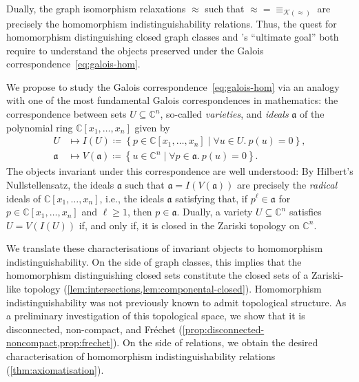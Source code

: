 \documentclass[11pt]{scrartcl}
\theoremstyle{definition}
\theoremstyle{plain}
\theoremstyle{remark}
\begin{document}
	
    Dually, the graph isomorphism relaxations $\approx$ such that ${\approx} = {\equiv_{\mathcal{K}({\approx})}}$
	are precisely the homomorphism indistinguishability relations.
	Thus, the quest for homomorphism distinguishing closed graph classes and \citeauthor{atserias_expressive_2021}'s \enquote{ultimate goal} both require to understand the objects preserved under the Galois correspondence~\eqref{eq:galois-hom}. 

	We propose to study the Galois correspondence~\eqref{eq:galois-hom} via an analogy with one of the most fundamental Galois correspondences in mathematics: 
	the correspondence between sets $U \subseteq \mathbb{C}^n$, so-called \emph{varieties}, and \emph{ideals} $\mathfrak{a}$ of the polynomial ring $\mathbb{C}[x_1, \dots, x_n]$ given by
	\begin{align*}
		U &\mapsto I(U) \coloneqq \left\{p \in \mathbb{C}[x_1, \dots, x_n] \mid\forall u \in U .\  p(u) = 0 \right\}, \\
		\mathfrak{a} & \mapsto V(\mathfrak{a}) \coloneqq \left\{u \in \mathbb{C}^n \mid \forall p \in \mathfrak{a}.\ p(u) = 0 \right\}.
	\end{align*}
	The objects invariant under this correspondence are well understood:
	By Hilbert's Nullstellensatz, the ideals $\mathfrak{a}$ such that $\mathfrak{a} = I(V(\mathfrak{a}))$ are precisely the \emph{radical} ideals of $\mathbb{C}[x_1, \dots, x_n]$, i.e., the ideals $\mathfrak{a}$ satisfying that, if $p^\ell \in \mathfrak{a}$ for $p \in \mathbb{C}[x_1, \dots, x_n]$ and $\ell \geq 1$, then $p \in \mathfrak{a}$.
	Dually, a variety $U \subseteq \mathbb{C}^n$ satisfies $U = V(I(U))$ if, and only if, it is closed in the Zariski topology on $\mathbb{C}^n$.
	
	We translate these characterisations of invariant objects to homomorphism indistinguishability. 
	On the side of graph classes, this implies that the homomorphism distinguishing closed sets constitute the closed sets of a Zariski-like topology (\cref{lem:intersections,lem:componental-closed}).
	Homomorphism indistinguishability was not previously known to admit topological structure.
	As a preliminary investigation of this topological space, we show that it is disconnected, non-compact, and Fr\'echet (\cref{prop:disconnected-noncompact,prop:frechet}).
	On the side of relations, we obtain the desired characterisation of homomorphism indistinguishability relations (\cref{thm:axiomatisation}).
\end{document}
